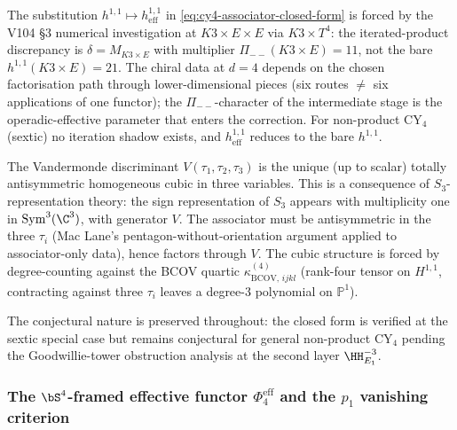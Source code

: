 \begin{remark}
\label{rem:cy4-iter-shadow-correction}
The substitution $h^{1,1} \mapsto h^{1,1}_{\mathrm{eff}}$ in
\eqref{eq:cy4-associator-closed-form} is forced by the V104 §3 numerical
investigation at $K3 \times E \times E$ via $K3 \times T^4$: the iterated-product
discrepancy is $\delta = M_{K3 \times E}$ with multiplier $\Pi_{--}(K3 \times E) =
11$, not the bare $h^{1,1}(K3 \times E) = 21$. The chiral data at $d=4$ depends on
the chosen factorisation path through lower-dimensional pieces \textup{(}six
routes $\ne$ six applications of one functor\textup{)}; the $\Pi_{--}$-character of
the intermediate stage is the operadic-effective parameter that enters the
correction. For non-product CY${}_4$ \textup{(}sextic\textup{)} no iteration shadow
exists, and $h^{1,1}_{\mathrm{eff}}$ reduces to the bare $h^{1,1}$.
\end{remark}

\begin{remark}
\label{rem:vandermonde-uniqueness}
The Vandermonde discriminant $V(\tau_1, \tau_2, \tau_3)$ is the unique \textup{(}up
to scalar\textup{)} totally antisymmetric homogeneous cubic in three variables. This
is a consequence of $S_3$-representation theory: the sign representation of $S_3$
appears with multiplicity one in $\mathrm{Sym}^3(\C^3)$, with generator $V$. The
associator must be antisymmetric in the three $\tau_i$ \textup{(}Mac Lane's
pentagon-without-orientation argument applied to associator-only data\textup{)},
hence factors through $V$. The cubic structure is forced by degree-counting against
the BCOV quartic $\kappa_{\mathrm{BCOV},\, ijkl}^{(4)}$ \textup{(}rank-four tensor on $H^{1,1}$,
contracting against three $\tau_i$ leaves a degree-$3$ polynomial on
$\mathbb{P}^1$\textup{)}.
\end{remark}
The conjectural nature is preserved throughout: the closed
form is verified at the sextic special case but remains conjectural for general
non-product CY${}_4$ pending the Goodwillie-tower obstruction analysis at the second
layer $\HH^{-3}_{E_1}$.


\subsubsection{The \texorpdfstring{$\bS^4$}{S-4}-framed effective functor \texorpdfstring{$\Phi_4^{\mathrm{eff}}$}{Phi-4-eff} and the \texorpdfstring{$p_1$}{p-1} vanishing criterion}
\label{subsubsec:phi-4-eff-p1-criterion}

